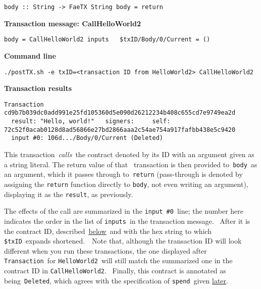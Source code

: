 \documentclass[11pt]{article}
\newcommand{\codeblock}[1]{\begin{mdframed}[
    backgroundcolor=header-color,
    linecolor=header-color,
    innertopmargin=10pt,
    ]{\texttt{#1}}\end{mdframed}}
\DeclareRobustCommand{\fuline}[1]{\texorpdfstring{\uline{#1}}{#1}}
\begin{document}
\codeblock{body :: String -\textgreater{} FaeTX String\newline
body = return}

\textbf{Transaction message: CallHelloWorld2}

\codeblock{body = CallHelloWorld2\newline
inputs\newline
  \$txID\slash{}Body\slash{}0\slash{}Current = ()  }

\textbf{Command line}

\codeblock{.\slash{}postTX.sh -e txID=\textless{}transaction ID from HelloWorld2\textgreater{} CallHelloWorld2}

\textbf{Transaction results}

\codeblock{Transaction cd9b7b039dc0add991e25fd105360d5e090d26212234b408c655cd7e9749ea2d\newline
  result: "Hello, world!"\newline
  signers:\newline
    self: 72c52f0acab0128d8ad56866e27bd2866aaa2c54ae754a917fafbb438e5c9420\newline
  input \#0: 106d...\slash{}Body\slash{}0\slash{}Current (Deleted)}

This transaction \textit{calls} the contract denoted by its ID with an argument given as a string literal. The return value of that  transaction is then provided to \texttt{body} as an argument, which it passes through to \texttt{return} (pass-through is denoted by assigning the \texttt{return} function directly to \texttt{body}, not even writing an argument), displaying it as the \texttt{result}, as previously.  


\vspace{11pt}

The effects of the call are summarized in the \texttt{input \#0} line; the number here indicates the order in the list of \texttt{inputs} in the transaction message.  After it is the contract ID, described \href{https://consensys.quip.com/IHP2AzL922EJ/Tutorial-1-Transactions-and-contracts\%23PfaACASIVxT}{\fuline{below}} and with the hex string to which \texttt{\$txID} expands shortened.  Note that, although the transaction ID will look different when you run these transactions, the one displayed after \texttt{Transaction} for \texttt{HelloWorld2} will still match the summarized one in the contract ID in \texttt{CallHelloWorld2}.  Finally, this contract is annotated as being \texttt{Deleted}, which agrees with the specification of \texttt{spend} given \href{https://consensys.quip.com/IHP2AzL922EJ/Tutorial-1-Transactions-and-contracts\%23PfaACAYEwGa}{\fuline{later}}.
\end{document}
